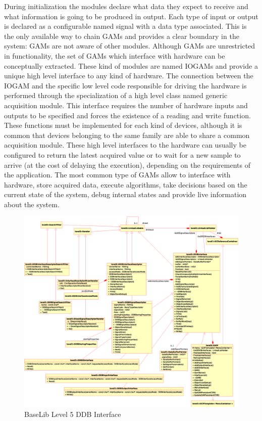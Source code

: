 During initialization the modules declare what data they expect to receive and what information is going to be produced in output. Each type of input or output is declared as a configurable named signal with a data type associated. This is the only available way to chain GAMs and provides a clear boundary in the system: GAMs are not aware of other modules. Although GAMs are unrestricted in functionality, the set of GAMs which interface with hardware can be conceptually extracted. These kind of modules are named IOGAMs and provide a unique high level interface to any kind of hardware. The connection between the IOGAM and the specific low level code responsible for driving the hardware is performed through the specialization of a high level class named generic acquisition module. This interface requires the number of hardware inputs and outputs to be specified and forces the existence of a reading and write function. These functions must be implemented for each kind of devices, although it is common that devices belonging to the same family are able to share a common acquisition module. These high level interfaces to the hardware can usually be configured to return the latest acquired value or to wait for a new sample to arrive (at the cost of delaying the execution), depending on the requirements of the application. The most common type of GAMs allow to interface with hardware, store acquired data, execute algorithms, take decisions based on the current state of the system, debug internal states and provide live information about the system.

\begin{figure}[h!]
 \begin{center}
  \includegraphics[width=\textwidth]{level5/level5-DDBInterface.eps}
  \caption{BaseLib Level 5 DDB Interface}
  \label{f:level5:DDBInterface}
 \end{center}
\end{figure}

